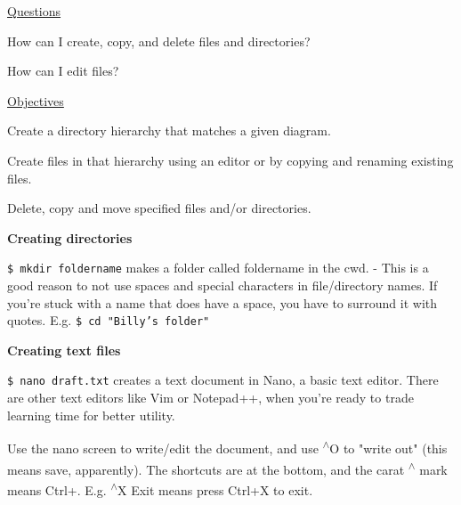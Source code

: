 \documentclass[12pt]{article}
\begin{document}
\color{gray}
\underline{Questions}

How can I create, copy, and delete files and directories?

How can I edit files?

\vspace{1em}
\underline{Objectives}

Create a directory hierarchy that matches a given diagram.

Create files in that hierarchy using an editor or by copying and renaming existing files.

Delete, copy and move specified files and/or directories.
\color{black}

\vspace{1em}
\textbf{Creating directories}

\texttt{\$ mkdir foldername} makes a folder called foldername in the cwd. - This is a good reason to not use spaces and special characters in file/directory names. If you're stuck with a name that does have a space, you have to surround it with quotes. E.g. \texttt{\$ cd "Billy's folder"}

\vspace{1em}
\textbf{Creating text files}

\texttt{\$ nano draft.txt} creates a text document in Nano, a basic text editor. There are other text editors like Vim or Notepad++, when you're ready to trade learning time for better utility.

Use the nano screen to write/edit the document, and use \textsuperscript{$\wedge$}O to "write out" (this means save, apparently). The shortcuts are at the bottom, and the carat \textsuperscript{$\wedge$} mark means Ctrl+. E.g. \textsuperscript{$\wedge$}X Exit means press Ctrl+X to exit.
\end{document}
